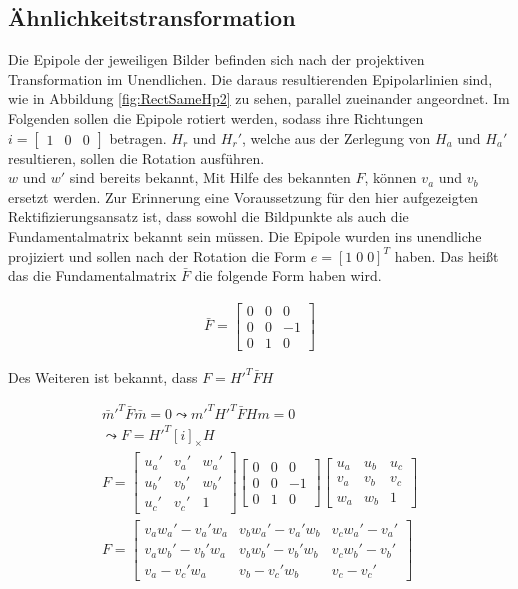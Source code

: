 \subsection{Ähnlichkeitstransformation}



Die Epipole der jeweiligen Bilder befinden sich nach der projektiven Transformation im Unendlichen. Die daraus resultierenden Epipolarlinien sind, wie in Abbildung \ref{fig:RectSameHp2} zu sehen, parallel zueinander angeordnet. Im Folgenden sollen die Epipole rotiert werden, sodass ihre Richtungen $i = \begin{bmatrix}1&0&0\end{bmatrix}$ betragen. $H_r$ und $H_r'$, welche aus der Zerlegung von $H_a$ und $H_a'$ resultieren, sollen die Rotation ausführen.\\

$w$ und $w'$ sind bereits bekannt, Mit Hilfe des bekannten $F$, können $v_a$ und $v_b$ ersetzt werden. Zur Erinnerung eine Voraussetzung für den hier aufgezeigten Rektifizierungsansatz ist, dass sowohl die Bildpunkte als auch die Fundamentalmatrix bekannt sein müssen. Die Epipole wurden ins unendliche projiziert und sollen nach der Rotation die Form $e = [1 \;0\;0]^T$ haben. Das heißt das die Fundamentalmatrix $\bar{F}$ die folgende Form haben wird.

\begin{gather}
	\bar{F} = \begin{bmatrix}
		0&0&0\\
		0&0&-1\\
		0&1&0
	\end{bmatrix}
\end{gather}

Des Weiteren ist bekannt, dass $F = H'^T \bar{F} H$ 


\begin{gather}
	\bar{m}'^T\bar{F} \bar{m} = 0 \leadsto m'^T H'^T \bar{F} H m = 0\\
	\leadsto F = H'^T[i]_\times H\\
	F=
		\begin{bmatrix}
	u_a'&v_a'&w_a'\\
	u_b'&v_b'&w_b'\\
	u_c'&v_c'&1
	\end{bmatrix}
	\begin{bmatrix}
	0&0&0\\
	0&0&-1\\
	0&1&0
	\end{bmatrix} 
	\begin{bmatrix}
	u_a&u_b&u_c\\
	v_a&v_b&v_c\\
	w_a&w_b&1
	\end{bmatrix}\\
		F=
	\begin{bmatrix}
	v_aw_a' - v_a'w_a&v_bw_a' - v_a'w_b&v_cw_a' - v_a'\\
	v_aw_b' - v_b'w_a&v_bw_b' - v_b'w_b&v_cw_b' - v_b'\\
	v_a - v_c'w_a&v_b - v_c'w_b&v_c-v_c'
	\end{bmatrix}\label{eq:6.45}
\end{gather}

